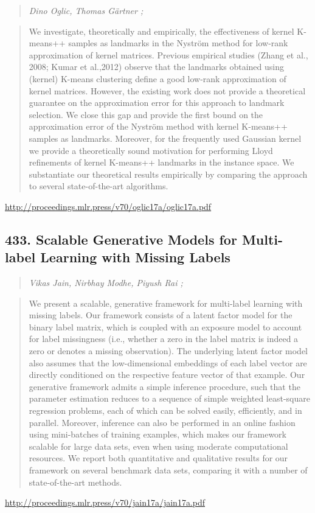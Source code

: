\documentclass{article}
\begin{document}
\begin{quote}
\footnotesize{\textit{Dino Oglic, Thomas Gärtner ;}}

\end{quote}

\begin{quote}
    We investigate, theoretically and empirically, the effectiveness of kernel K-means++ samples as landmarks in the Nyström method for low-rank approximation of kernel matrices. Previous empirical studies (Zhang et al., 2008; Kumar et al.,2012) observe that the landmarks obtained using (kernel) K-means clustering define a good low-rank approximation of kernel matrices. However, the existing work does not provide a theoretical guarantee on the approximation error for this approach to landmark selection. We close this gap and provide the first bound on the approximation error of the Nyström method with kernel K-means++ samples as landmarks. Moreover, for the frequently used Gaussian kernel we provide a theoretically sound motivation for performing Lloyd refinements of kernel K-means++ landmarks in the instance space. We substantiate our theoretical results empirically by comparing the approach to several state-of-the-art algorithms.  
\end{quote}

\href{http://proceedings.mlr.press/v70/oglic17a/oglic17a.pdf}{http://proceedings.mlr.press/v70/oglic17a/oglic17a.pdf}

\subsection{433. Scalable Generative Models for Multi-label Learning with Missing Labels}

\begin{quote}
\footnotesize{\textit{Vikas Jain, Nirbhay Modhe, Piyush Rai ;}}

\end{quote}

\begin{quote}
    We present a scalable, generative framework for multi-label learning with missing labels. Our framework consists of a latent factor model for the binary label matrix, which is coupled with an exposure model to account for label missingness (i.e., whether a zero in the label matrix is indeed a zero or denotes a missing observation). The underlying latent factor model also assumes that the low-dimensional embeddings of each label vector are directly conditioned on the respective feature vector of that example. Our generative framework admits a simple inference procedure, such that the parameter estimation reduces to a sequence of simple weighted least-square regression problems, each of which can be solved easily, efficiently, and in parallel. Moreover, inference can also be performed in an online fashion using mini-batches of training examples, which makes our framework scalable for large data sets, even when using moderate computational resources. We report both quantitative and qualitative results for our framework on several benchmark data sets, comparing it with a number of state-of-the-art methods.  
\end{quote}

\href{http://proceedings.mlr.press/v70/jain17a/jain17a.pdf}{http://proceedings.mlr.press/v70/jain17a/jain17a.pdf}
\end{document}
